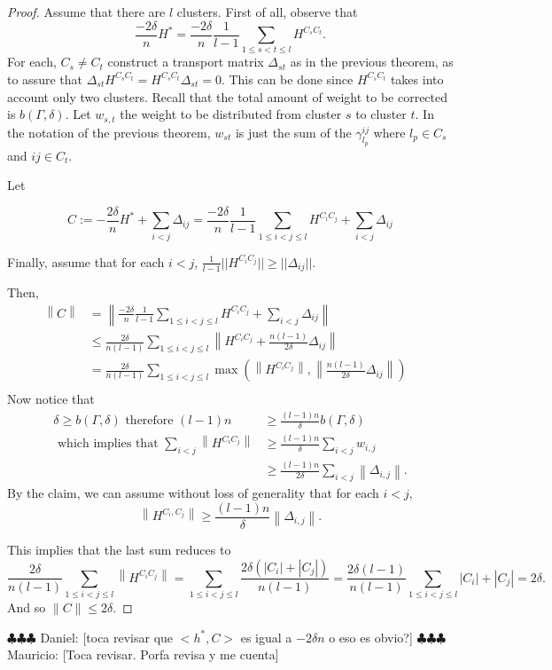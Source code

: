 \documentclass[12pt]{amsart}
\theoremstyle{remark}
\newcommand{\ddr}[1]{{\color{blue} \sf $\clubsuit\clubsuit\clubsuit$ Daniel: [#1]}}
\newcommand{\mv}[1]{{\color{red} \sf $\clubsuit\clubsuit\clubsuit$ Mauricio: [#1]}}
\begin{document}
\begin{proof}

Assume that there are $l$ clusters. First of all, observe that
\[
\frac{-2\delta}{n}H^* = \frac{-2\delta}{n}\frac{1}{l-1}\sum_{1\leq s<t\leq l}H^{C_sC_t}.
\]
For each, $C_s\neq C_t$ construct a transport matrix $\Delta_{st}$ as in the previous theorem, as to assure that $\Delta_{st}H^{C_sC_t} = H^{C_sC_t} \Delta_{st}=0$. This can be done since $H^{C_sC_t}$ takes into account only two clusters. Recall that the total amount of weight to be corrected is $b(\Gamma,\delta)$. Let $w_{s,t}$ the weight to be distributed from cluster $s$ to cluster $t$. In the notation of the previous theorem, $w_{st}$ is just the sum of the 
$\gamma_{l_p}^{ij}$ where $l_p\in C_s $ and $ij \in C_t $.


Let 

\[
C:= -\frac{2\delta}{n}H^* + \sum_{i<j}\Delta_{ij} = \frac{-2\delta}{n}\frac{1}{l-1}\sum_{1\leq i<j\leq l}H^{C_iC_j} + \sum_{i<j}\Delta_{ij}
\]

Finally, assume that for each $i<j$, $\frac{1}{l-1}||H^{C_iC_j}||\geq ||\Delta_{ij}||$.

Then,
\[
\begin{aligned}
\left\|C\right \| & = \left\| \frac{-2\delta}{n}\frac{1}{l-1}\sum_{1\leq i<j\leq l}H^{C_iC_j} + \sum_{i<j}\Delta_{ij}  \right \|  \\ & \leq \frac{2\delta}{n(l-1)}\sum_{1\leq i<j\leq l}\left \|H^{C_iC_j}+ \frac{n(l-1)}{2\delta} \Delta_{ij}\right \|  \\
& = \frac{2\delta}{n(l-1)}\sum_{1\leq i<j\leq l} \max (\left\|H^{C_iC_j}\right\|,\left\|\frac{n(l-1)}{2\delta}\Delta_{ij}\right\|)& \\
\end{aligned}
\]
Now notice that 
\[
\begin{aligned}
\delta \geq b(\Gamma,\delta) \text{ therefore } (l-1)n & \geq \frac{(l-1)n}{\delta} b(\Gamma,\delta) \\\text{ which implies that }  \sum_{i<j}\left \|H^{C_iC_j}\right \|  & \geq  \frac{(l-1)n}{\delta}\sum_{i<j}w_{i,j}   \\
 & \geq \frac{(l-1)n}{2\delta}\sum_{i<j}\left \|\Delta_{i,j} \right \|  .
\end{aligned}
\]
By the claim, we can assume without loss of generality that
for each $i<j$,
\[
\left \|H^{C_i,C_j}\right \| \geq  \frac{(l-1)n}{\delta}\left \|\Delta_{i,j} \right \|.
\]

This implies that the last sum reduces to
\[
\frac{2\delta}{n(l-1)}\sum_{1\leq i<j\leq l} \left\|H^{C_iC_j}\right\| = \sum_{1\leq i<j\leq l} \frac{2\delta(|C_i|+|C_j|)}{n(l-1)} = \frac{2\delta(l-1)}{n(l-1)}\sum_{1\leq i<j\leq l}|C_i|+|C_j|=2\delta.
\]
And so
$\|C\| \leq 2\delta$.

\end{proof}
\ddr{toca revisar que $<h^*,C>$ es igual a $-2\delta n$ o eso es obvio?}
\mv{Toca revisar. Porfa revisa y me cuenta}
\end{document}
